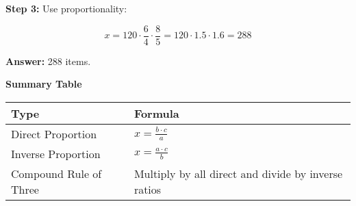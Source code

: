 \textbf{Step 3:} Use proportionality:

\[
    x = 120 \cdot \frac{6}{4} \cdot \frac{8}{5} = 120 \cdot 1.5 \cdot 1.6 = 288
\]

\textbf{Answer:} 288 items.
\vspace{\baselineskip}

\textbf{Summary Table}

\begin{center}
    \begin{tabular}{|l|l|}
    \hline
    \textbf{Type} & \textbf{Formula} \\
    \hline
    Direct Proportion & \(x = \frac{b \cdot c}{a}\) \\
    Inverse Proportion & \(x = \frac{a \cdot c}{b}\) \\
    Compound Rule of Three & Multiply by all direct and divide by inverse ratios \\
    \hline
    \end{tabular}
\end{center}


